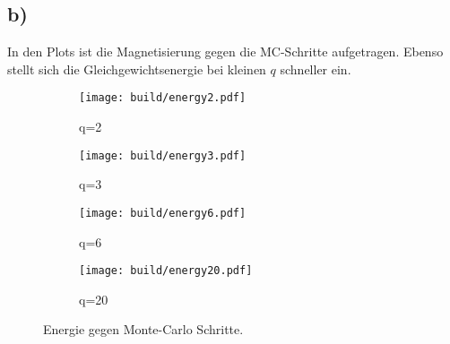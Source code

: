\documentclass{scrartcl}
\begin{document}
\subsection*{b)}
In den Plots ist die Magnetisierung gegen die MC-Schritte aufgetragen. 
Ebenso stellt sich die Gleichgewichtsenergie bei kleinen $q$ schneller ein.
\begin{figure}[ht]
		\centering
		\begin{subfigure}[b]{0.49\textwidth}
				\begin{center}
						\texttt{[image: build/energy2.pdf]}
				\end{center}
				\caption{q=2}
		\end{subfigure}
		\begin{subfigure}[b]{0.49\textwidth}
				\begin{center}
						\texttt{[image: build/energy3.pdf]}
				\end{center}
				\caption{q=3}
		\end{subfigure}
		\begin{subfigure}[b]{0.49\textwidth}
				\begin{center}
						\texttt{[image: build/energy6.pdf]}
				\end{center}
				\caption{q=6}
		\end{subfigure}
		\begin{subfigure}[b]{0.49\textwidth}
				\begin{center}
						\texttt{[image: build/energy20.pdf]}
				\end{center}
				\caption{q=20}
		\end{subfigure}
		\caption{Energie gegen Monte-Carlo Schritte.}%
		\label{fig:1}
\end{figure}
\end{document}
